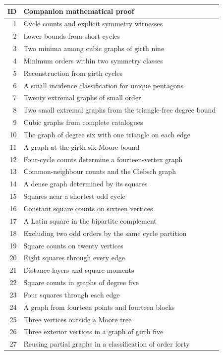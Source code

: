 \begin{longtable}{rp{}}
\toprule ID & Companion mathematical proof \\ \midrule\endhead
1 & Cycle counts and explicit symmetry witnesses \\
2 & Lower bounds from short cycles \\
3 & Two minima among cubic graphs of girth nine \\
4 & Minimum orders within two symmetry classes \\
5 & Reconstruction from girth cycles \\
6 & A small incidence classification for unique pentagons \\
7 & Twenty extremal graphs of small order \\
8 & Two small extremal graphs from the triangle-free degree bound \\
9 & Cubic graphs from complete catalogues \\
10 & The graph of degree six with one triangle on each edge \\
11 & A graph at the girth-six Moore bound \\
12 & Four-cycle counts determine a fourteen-vertex graph \\
13 & Common-neighbour counts and the Clebsch graph \\
14 & A dense graph determined by its squares \\
15 & Squares near a shortest odd cycle \\
16 & Constant square counts on sixteen vertices \\
17 & A Latin square in the bipartite complement \\
18 & Excluding two odd orders by the same cycle partition \\
19 & Square counts on twenty vertices \\
20 & Eight squares through every edge \\
21 & Distance layers and square moments \\
22 & Square counts in graphs of degree five \\
23 & Four squares through each edge \\
24 & A graph from fourteen points and fourteen blocks \\
25 & Three vertices outside a Moore tree \\
26 & Three exterior vertices in a graph of girth five \\
27 & Reusing partial graphs in a classification of order forty \\

\end{longtable}
